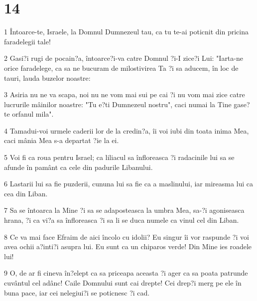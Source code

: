 \chapter{14}

\par 1 Întoarce-te, Israele, la Domnul Dumnezeul tau, ca tu te-ai poticnit din pricina faradelegii tale!
\par 2 Gasi?i rugi de pocain?a, întoarce?i-va catre Domnul ?i-I zice?i Lui: "Iarta-ne orice faradelege, ca sa ne bucuram de milostivirea Ta ?i sa aducem, în loc de tauri, lauda buzelor noastre:
\par 3 Asiria nu ne va scapa, noi nu ne vom mai sui pe cai ?i nu vom mai zice catre lucrurile mâinilor noastre: "Tu e?ti Dumnezeul nostru", caci numai la Tine gase?te orfanul mila".
\par 4 Tamadui-voi urmele caderii lor de la credin?a, îi voi iubi din toata inima Mea, caci mânia Mea s-a departat ?ie la ei.
\par 5 Voi fi ca roua pentru Israel; ca liliacul sa înfloreasca ?i radacinile lui sa se afunde în pamânt ca cele din padurile Libanului.
\par 6 Lastarii lui sa fie puzderii, cununa lui sa fie ca a maslinului, iar mireasma lui ca cea din Liban.
\par 7 Sa se întoarca la Mine ?i sa se adaposteasca la umbra Mea, sa-?i agoniseasca hrana, ?i ca vi?a sa înfloreasca ?i sa li se duca numele ca vinul cel din Liban.
\par 8 Ce va mai face Efraim de aici încolo cu idolii? Eu singur îi vor raspunde ?i voi avea ochii a?inti?i asupra lui. Eu sunt ca un chiparos verde! Din Mine ies roadele lui!
\par 9 O, de ar fi cineva în?elept ca sa priceapa aceasta ?i ager ca sa poata patrunde cuvântul cel adânc! Caile Domnului sunt cai drepte! Cei drep?i merg pe ele în buna pace, iar cei nelegiui?i se poticnesc ?i cad.


